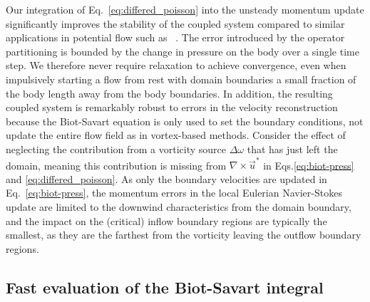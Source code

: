 \documentclass[final,1p,times]{elsarticle}
\begin{document}
Our integration of Eq.~\ref{eq:differed_poisson} into the unsteady momentum update significantly improves the stability of the coupled system compared to similar applications in potential flow such as ~\cite{Miller2008AnBoundaries}. The error introduced by the operator partitioning is bounded by the change in pressure on the body over a single time step. We therefore never require relaxation to achieve convergence, even when impulsively starting a flow from rest with domain boundaries a small fraction of the body length away from the body boundaries. 
In addition, the resulting coupled system is remarkably robust to errors in the velocity reconstruction because the Biot-Savart equation is only used to set the boundary conditions, not update the entire flow field as in vortex-based methods. Consider the effect of neglecting the contribution from a vorticity source $\Delta\omega$ that has just left the domain, meaning this contribution is missing from $\nabla\times\vec u^*$ in Eqs.\ref{eq:biot-press} and \ref{eq:differed_poisson}. As only the boundary velocities are updated in Eq.~\ref{eq:biot-press}, the momentum errors in the local Eulerian Navier-Stokes update are limited to the downwind characteristics from the domain boundary, and the impact on the (critical) inflow boundary regions are typically the smallest, as they are the farthest from the vorticity leaving the outflow boundary regions. 


\subsection{Fast evaluation of the Biot-Savart integral}
\end{document}
